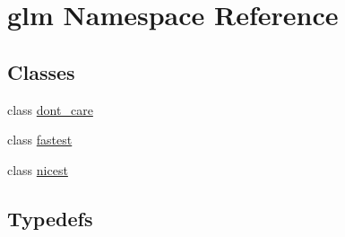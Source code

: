 \hypertarget{namespaceglm}{}\section{glm Namespace Reference}
\label{namespaceglm}
\subsection*{Classes}
\begin{DoxyCompactItemize}
\item 
class \hyperlink{classglm_1_1dont__care}{dont\+\_\+care}
\item 
class \hyperlink{classglm_1_1fastest}{fastest}
\item 
class \hyperlink{classglm_1_1nicest}{nicest}
\end{DoxyCompactItemize}
\subsection*{Typedefs}
